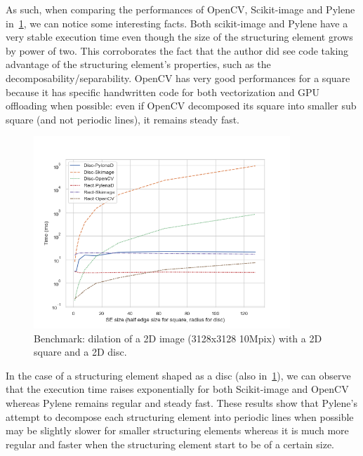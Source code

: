 As such, when comparing the performances of OpenCV, Scikit-image and Pylene in~\cref{fig:gen.bench.square.disc}, we can
notice some interesting facts. Both scikit-image and Pylene have a very stable execution time even though the size of
the structuring element grows by power of two. This corroborates the fact that the author did see code taking advantage
of the structuring element's properties, such as the decomposability/separability. OpenCV has very good performances for
a square because it has specific handwritten code for both vectorization and GPU offloading when possible: even if
OpenCV decomposed its square into smaller sub square (and not periodic lines), it remains steady fast.

\begin{figure}[htb]
  \centering
  \includegraphics[width=3.8in]{figs/bench_disc_rect_by_SE}
  \caption{Benchmark: dilation of a 2D image (3128x3128 \eqmark 10Mpix) with a 2D square and a 2D disc.}
  \label{fig:gen.bench.square.disc}
\end{figure}



In the case of a structuring element shaped as a disc (also in~\cref{fig:gen.bench.square.disc}), we can observe that
the execution time raises exponentially for both Scikit-image and OpenCV whereas Pylene remains regular and steady fast.
These results show that Pylene's attempt to decompose each structuring element into periodic lines when possible may be
slightly slower for smaller structuring elements whereas it is much more regular and faster when the structuring element
start to be of a certain size.


